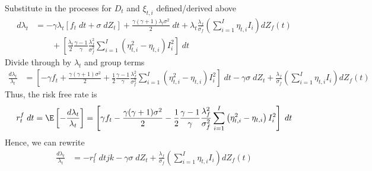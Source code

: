 \documentclass[12pt]{article}
\theoremstyle{plain}
\theoremstyle{definition}
\theoremstyle{remark}
\begin{document}
Substitute in the proceses for $D_t$ and $\xi_{t,i}$ defined/derived
above
\begin{align*}
  d\lambda_t
  &=
  -\gamma
  \lambda_t
  \left[
    f_t\;dt + \sigma \;dZ_t
  \right]
  +
  \frac{\gamma(\gamma+1)\lambda_t\sigma^2}{2}
  \;dt
  +
  \lambda_t
  \frac{\lambda_f}{\sigma_f}
  \left(
  \sum_{i=1}^I
  \eta_{t,i}
  I_i
  \right)
  dZ_f(t)
  \\
  &\qquad
  +
  \left[
  \frac{\lambda_t}{2}
  \frac{\gamma-1}{\gamma}
  \frac{\lambda_f^2}{\sigma^2_f}
  \sum_{i=1}^I
  \left(
    \eta_{t,i}^2
    -
    \eta_{t,i}
  \right)
  I_i^2
  \right]
  \;dt
\end{align*}
Divide through by $\lambda_t$ and group terms
\begin{align*}
  \frac{d\lambda_t}{\lambda_t}
  &=
  \left[
    -\gamma
    f_t
    + \frac{\gamma(\gamma+1)\sigma^2}{2}
    +
    \frac{1}{2}
    \frac{\gamma-1}{\gamma}
    \frac{\lambda_f^2}{\sigma^2_f}
    \sum_{i=1}^I
    \left(
      \eta_{t,i}^2
      -
      \eta_{t,i}
    \right)
    I_i^2
  \right]
  \;dt
  - \gamma \sigma \;dZ_t
  +
  \frac{\lambda_f}{\sigma_f}
  \left(
  \sum_{i=1}^I
  \eta_{t,i}
  I_i
  \right)
  dZ_f(t)
\end{align*}
Thus, the risk free rate is
\begin{align*}
  r_t^f\;dt
  =
  \E
  \left[
  -\frac{d\lambda_t}{\lambda_t}
  \right]
  =
  \left[
    \gamma
    f_t
    - \frac{\gamma(\gamma+1)\sigma^2}{2}
    -
    \frac{1}{2}
    \frac{\gamma-1}{\gamma}
    \frac{\lambda_f^2}{\sigma^2_f}
    \sum_{i=1}^I
    \left(
      \eta_{t,i}^2
      -
      \eta_{t,i}
    \right)
    I_i^2
  \right]
  \;dt
\end{align*}
Hence, we can rewrite
\begin{align*}
  \frac{d\lambda_t}{\lambda_t}
  &=
  -r_t^f\;dt
  jk- \gamma \sigma \;dZ_t
  +
  \frac{\lambda_f}{\sigma_f}
  \left(
  \sum_{i=1}^I
  \eta_{t,i}
  I_i
  \right)
  dZ_f(t)
\end{align*}


















\end{document}
